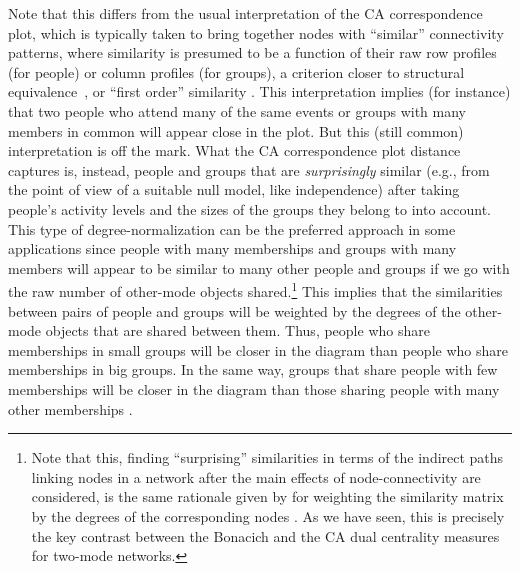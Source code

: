 \documentclass[a4paper,fleqn]{cas-sc}
\begin{document}
Note that this differs from the usual interpretation of the CA correspondence plot, which is typically taken to bring together nodes with ``similar'' connectivity patterns, where similarity is presumed to be a function of their raw row profiles (for people) or column profiles (for groups), a criterion closer to structural equivalence~\citep{desposito2014comparison}, or ``first order'' similarity \citet{kovacs2010generalized}. This interpretation implies (for instance) that two people who attend many of the same events or groups with many members in common will appear close in the plot. But this (still common) interpretation is off the mark. What the CA correspondence plot distance captures is, instead, people and groups that are \textit{surprisingly} similar (e.g., from the point of view of a suitable null model, like independence) after taking people's activity levels and the sizes of the groups they belong to into account. This type of degree-normalization can be the preferred approach in some applications since people with many memberships and groups with many members will appear to be similar to many other people and groups if we go with the raw number of other-mode objects shared.\footnote{Note that this, finding ``surprising'' similarities in terms of the indirect paths linking nodes in a network after the main effects of node-connectivity are considered, is the same rationale given by \cite{leicht2006vertex} for weighting the \citet{katz1953new} similarity matrix by the degrees of the corresponding nodes \citep[see][68, eqs. 2.13 and 2.14]{fouss2016algorithms}. As we have seen, this is precisely the key contrast between the Bonacich and the CA dual centrality measures for two-mode networks.} This implies that the similarities between pairs of people and groups will be weighted by the degrees of the other-mode objects that are shared between them. Thus, people who share memberships in small groups will be closer in the diagram than people who share memberships in big groups. In the same way, groups that share people with few memberships will be closer in the diagram than those sharing people with many other memberships \citep{desposito2014comparison}. 
\end{document}
